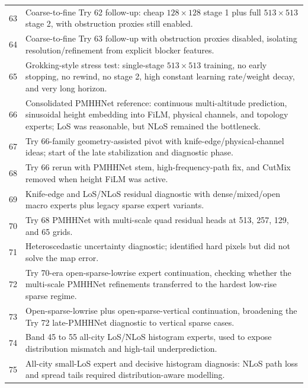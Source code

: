 \begin{table}[H]
\begin{tabularx}{\textwidth}{p{}>{\raggedright\arraybackslash}X}
63 & Coarse-to-fine Try 62 follow-up: cheap \(128\times128\) stage 1 plus full \(513\times513\) stage 2, with obstruction proxies still enabled. \\
64 & Coarse-to-fine Try 63 follow-up with obstruction proxies disabled, isolating resolution/refinement from explicit blocker features. \\
65 & Grokking-style stress test: single-stage \(513\times513\) training, no early stopping, no rewind, no stage 2, high constant learning rate/weight decay, and very long horizon. \\
66 & Consolidated PMHHNet reference: continuous multi-altitude prediction, sinusoidal height embedding into FiLM, physical channels, and topology experts; LoS was reasonable, but NLoS remained the bottleneck. \\
67 & Try 66-family geometry-assisted pivot with knife-edge/physical-channel ideas; start of the late stabilization and diagnostic phase. \\
68 & Try 66 rerun with PMHHNet stem, high-frequency-path fix, and CutMix removed when height FiLM was active. \\
69 & Knife-edge and LoS/NLoS residual diagnostic with dense/mixed/open macro experts plus legacy sparse expert variants. \\
70 & Try 68 PMHHNet with multi-scale quad residual heads at 513, 257, 129, and 65 grids. \\
71 & Heteroscedastic uncertainty diagnostic; identified hard pixels but did not solve the map error. \\
72 & Try 70-era open-sparse-lowrise expert continuation, checking whether the multi-scale PMHHNet refinements transferred to the hardest low-rise sparse regime. \\
73 & Open-sparse-lowrise plus open-sparse-vertical continuation, broadening the Try 72 late-PMHHNet diagnostic to vertical sparse cases. \\
74 & Band 45 to 55 all-city LoS/NLoS histogram experts, used to expose distribution mismatch and high-tail underprediction. \\
75 & All-city small-LoS expert and decisive histogram diagnosis: NLoS path loss and spread tails required distribution-aware modelling. \\
\bottomrule
\end{tabularx}
\end{table}
\normalsize

